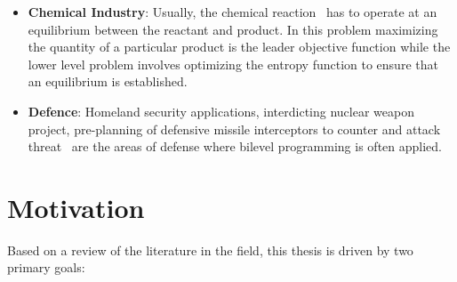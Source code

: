 \begin{itemize}
\item{}\textbf{Chemical Industry}: Usually, the chemical reaction~\cite{smith139chemical} has to operate at an equilibrium between the reactant and product. In this problem maximizing the quantity of a particular product is the leader objective function while the lower level problem involves optimizing the entropy function to ensure that an equilibrium is established.
\item{}\textbf{Defence}: Homeland security applications, interdicting nuclear weapon project, pre-planning of defensive missile interceptors to counter and attack threat~\cite{brown2005two} are the areas of defense where bilevel programming is often applied.		
\end{itemize}



\section{Motivation}

Based on a review of the literature in the field, this thesis is driven by two primary goals: 

